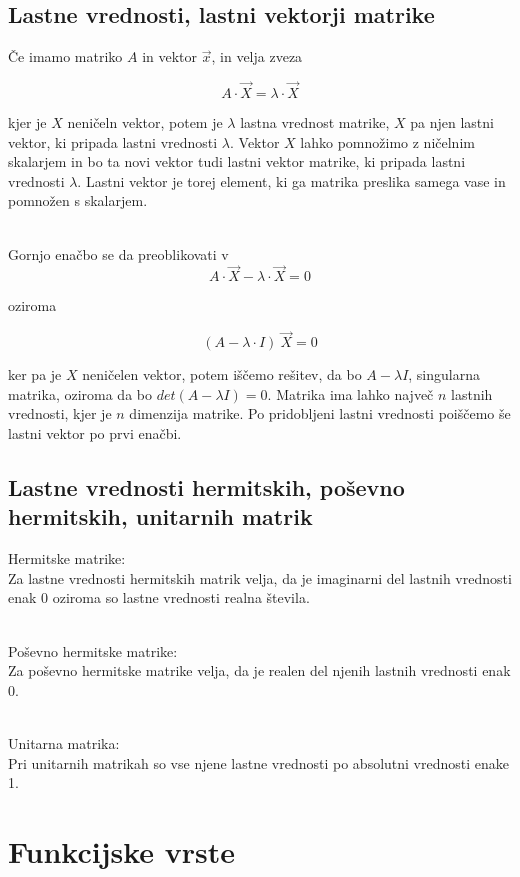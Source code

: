 \documentclass[12pt]{report}
\begin{document}
\pagebreak
\section*{Lastne vrednosti, lastni vektorji matrike}

Če imamo matriko $A$ in vektor $\vec x$, in velja zveza 

\[
A \cdot \vec X = \lambda\cdot\vec X
\]

kjer je $X$ neničeln vektor,
potem je $\lambda$ lastna vrednost matrike, $X$ pa njen lastni vektor, ki pripada lastni vrednosti $\lambda$. Vektor $X$ lahko pomnožimo z ničelnim skalarjem in bo ta novi vektor tudi lastni vektor matrike, ki pripada lastni vrednosti $\lambda$. Lastni vektor je torej element, ki ga matrika preslika samega vase in pomnožen s skalarjem.\\\


Gornjo enačbo se da preoblikovati v
\[
A\cdot \vec X -\lambda\cdot\vec X= 0
\]

oziroma 

\[
(A-\lambda\cdot I)\ \vec X = 0
\]

ker pa je $X$ neničelen vektor, potem iščemo rešitev, da bo 
$A-\lambda I$, singularna matrika, oziroma da bo $det(A-\lambda I) = 0$. Matrika ima lahko največ $n$ lastnih vrednosti, kjer je $n$ dimenzija matrike. Po pridobljeni lastni vrednosti poiščemo še lastni vektor po prvi enačbi.



\section*{Lastne vrednosti hermitskih, poševno hermitskih, unitarnih matrik}

Hermitske matrike:  \\
Za lastne vrednosti hermitskih matrik velja, da je imaginarni del lastnih vrednosti enak 0 oziroma so lastne vrednosti realna števila.\\\

Poševno hermitske matrike:  \\
Za poševno hermitske matrike velja, da je realen del njenih lastnih vrednosti enak 0.\\\

Unitarna matrika:  \\
Pri unitarnih matrikah so vse njene lastne vrednosti po absolutni vrednosti enake 1.






\chapter*{Funkcijske vrste}
\end{document}
